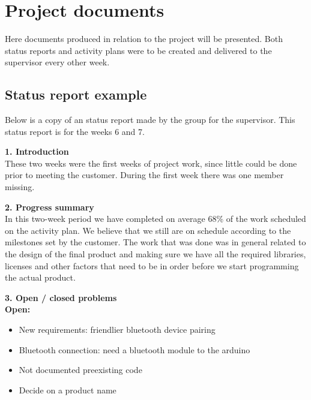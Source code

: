 \chapter{Project documents}
\label{appendix-project-documents}
Here documents produced in relation to the project will be presented. Both status reports and activity plans were to be created and delivered to the supervisor every other week. 

\section{Status report example}
Below is a copy of an status report made by the group for the supervisor. This status report is for the weeks 6 and 7.\\
\newline

\textbf{1. Introduction}\\
These two weeks were the first weeks of project work, since little could be done prior to meeting the customer. During the first week there was one member missing.\\
\newline

\textbf{2. Progress summary}\\
In this two-week period we have completed on average 68\% of the work scheduled on the activity plan. We believe that we still are on schedule according to the milestones set by the customer. The work that was done was in general related to the design of the final product and making sure we have all the required libraries, licenses and other factors that need to be in order before we start programming the actual product.\\
\newline

\textbf{3. Open / closed problems}\\
\newline
\textbf{Open:}
\begin{itemize}
	\item{New requirements: friendlier bluetooth device pairing}
	\item{Bluetooth connection: need a bluetooth module to the arduino}
	\item{Not documented preexisting code}
	\item{Decide on a product name}
\end{itemize}
\vspace{8mm}


